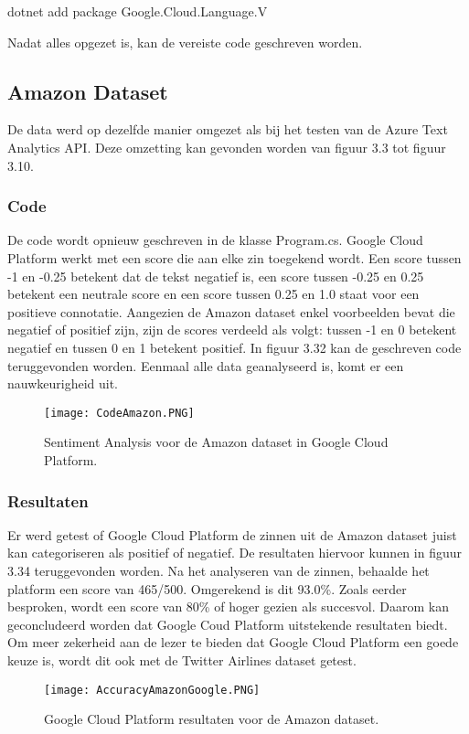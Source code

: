 dotnet add package Google.Cloud.Language.V

Nadat alles opgezet is, kan de vereiste code geschreven worden.


\subsection{Amazon Dataset}
\label{amazongoogleplatform}

De data werd op dezelfde manier omgezet als bij het testen van de Azure Text Analytics API. Deze omzetting kan gevonden worden van figuur 3.3 tot figuur 3.10.

\subsubsection{Code}
\label{amazoncodegoogleplatform}
De code wordt opnieuw geschreven in de klasse Program.cs. Google Cloud Platform werkt met een score die aan elke zin toegekend wordt. Een score tussen -1 en -0.25 betekent dat de tekst negatief is, een score tussen -0.25 en 0.25 betekent een neutrale score en een score tussen 0.25 en 1.0 staat voor een positieve connotatie. Aangezien de Amazon dataset enkel voorbeelden bevat die negatief of positief zijn, zijn de scores verdeeld als volgt: tussen -1 en 0 betekent negatief en tussen 0 en 1 betekent positief. In figuur 3.32 kan de geschreven code teruggevonden worden. Eenmaal alle data geanalyseerd is, komt er een nauwkeurigheid uit. 

\begin{figure}[!htbp]
    \texttt{[image: CodeAmazon.PNG]}
    \caption{\label{codeamazon}Sentiment Analysis voor de Amazon dataset in Google Cloud Platform.}
\end{figure}
\FloatBarrier 

\subsubsection{Resultaten}
\label{amazonresultatengoogleplatform}

Er werd getest of Google Cloud Platform de zinnen uit de Amazon dataset juist kan categoriseren als positief of negatief. De resultaten hiervoor kunnen in figuur 3.34 teruggevonden worden. Na het analyseren van de zinnen, behaalde het platform een score van 465/500. Omgerekend is dit 93.0\%. Zoals eerder besproken, wordt een score van 80\% of hoger gezien als succesvol. Daarom kan geconcludeerd worden dat Google Coud Platform uitstekende resultaten biedt. Om meer zekerheid aan de lezer te bieden dat Google Cloud Platform een goede keuze is, wordt dit ook met de Twitter Airlines dataset getest. 
\begin{figure}[!htbp]
    \texttt{[image: AccuracyAmazonGoogle.PNG]}
    \caption{\label{accuracyTwitter}Google Cloud Platform resultaten voor de Amazon dataset.}
\end{figure}
\FloatBarrier 

